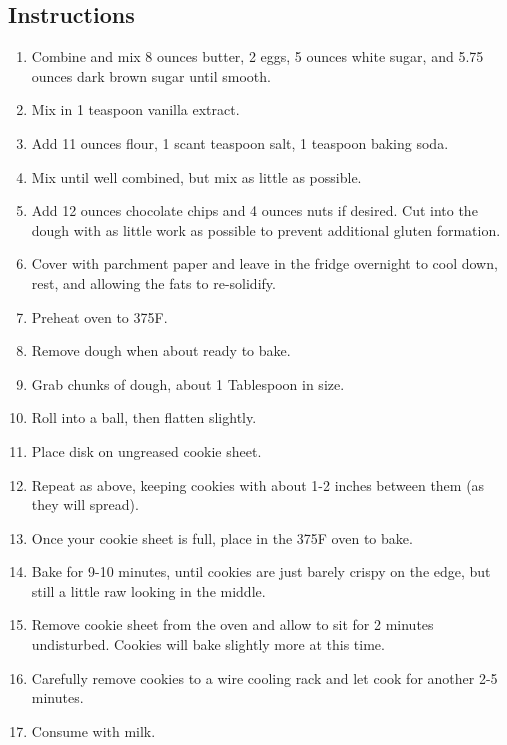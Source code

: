 \begin{multicols}{2}
\subsection*{Instructions}
\begin{enumerate}
    \item Combine and mix 8 ounces butter, 2 eggs, 5 ounces white sugar, and 5.75 ounces dark brown sugar until smooth.
    \item Mix in 1 teaspoon vanilla extract.
    \item Add 11 ounces flour, 1 scant teaspoon salt, 1 teaspoon baking soda.
    \item Mix until well combined, but mix as little as possible.
    \item Add 12 ounces chocolate chips and 4 ounces nuts if desired. Cut into the dough with as little work as possible to prevent additional gluten formation.
    \item Cover with parchment paper and leave in the fridge overnight to cool down, rest, and allowing the fats to re-solidify.
    \item Preheat oven to 375F.
    \item Remove dough when about ready to bake.
    \item Grab chunks of dough, about 1 Tablespoon in size.
    \item Roll into a ball, then flatten slightly.
    \item Place disk on ungreased cookie sheet.
    \item Repeat as above, keeping cookies with about 1-2 inches between them (as they will spread).
    \item Once your cookie sheet is full, place in the 375F oven to bake.
    \item Bake for 9-10 minutes, until cookies are just barely crispy on the edge, but still a little raw looking in the middle.
    \item Remove cookie sheet from the oven and allow to sit for 2 minutes undisturbed. Cookies will bake slightly more at this time.
    \item Carefully remove cookies to a wire cooling rack and let cook for another 2-5 minutes.
    \item Consume with milk.
\end{enumerate}


\end{multicols}
